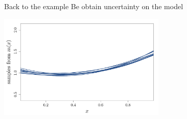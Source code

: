 \documentclass{beamer}
\DeclareMathOperator*{\Cov}{cov}
\begin{document}
% 

\begin{frame}{}
\begin{exampleblock}{Back to the example}
Be obtain uncertainty on the model
\begin{center}
  \includegraphics[height=5cm]{figures/R/linreg_4}
\end{center}
\end{exampleblock}
\end{frame}
\end{document}
